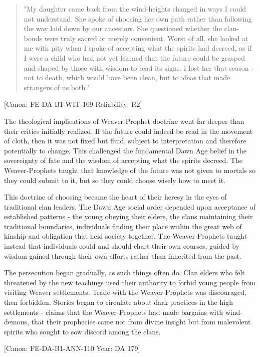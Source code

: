 \begin{quote}
"My daughter came back from the wind-heights changed in ways I could not
understand. She spoke of choosing her own path rather than following the
way laid down by our ancestors. She questioned whether the clan-bonds
were truly sacred or merely convenient. Worst of all, she looked at me
with pity when I spoke of accepting what the spirits had decreed, as if
I were a child who had not yet learned that the future could be grasped
and shaped by those with wisdom to read its signs. I lost her that
season - not to death, which would have been clean, but to ideas that
made strangers of us both."
\end{quote}

{[}Canon: FE-DA-B1-WIT-109 \textbar{} Reliability: R2{]}

The theological implications of Weaver-Prophet doctrine went far deeper
than their critics initially realized. If the future could indeed be
read in the movement of cloth, then it was not fixed but fluid, subject
to interpretation and therefore potentially to change. This challenged
the fundamental Dawn Age belief in the sovereignty of fate and the
wisdom of accepting what the spirits decreed. The Weaver-Prophets taught
that knowledge of the future was not given to mortals so they could
submit to it, but so they could choose wisely how to meet it.

This doctrine of choosing became the heart of their heresy in the eyes
of traditional clan leaders. The Dawn Age social order depended upon
acceptance of established patterns - the young obeying their elders, the
clans maintaining their traditional boundaries, individuals finding
their place within the great web of kinship and obligation that held
society together. The Weaver-Prophets taught instead that individuals
could and should chart their own courses, guided by wisdom gained
through their own efforts rather than inherited from the past.

The persecution began gradually, as such things often do. Clan elders
who felt threatened by the new teachings used their authority to forbid
young people from visiting Weaver settlements. Trade with the
Weaver-Prophets was discouraged, then forbidden. Stories began to
circulate about dark practices in the high settlements - claims that the
Weaver-Prophets had made bargains with wind-demons, that their
prophecies came not from divine insight but from malevolent spirits who
sought to sow discord among the clans.

{[}Canon: FE-DA-B1-ANN-110 \textbar{} Year: DA 179{]}

